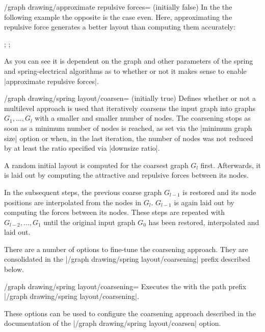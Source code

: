 \begin{key}{/graph drawing/approximate repulsive 
  forces= (initially false)}
  In the the following example the opposite is the case even. Here,
  approximating the repulsive force generates a better layout than
  computing them accurately:
  \begin{codeexample}[width=6cm]
\tikz {};
\tikz {};
  \end{codeexample}
  
  As you can see it is dependent on the graph and other parameters of
  the spring and spring-electrical algorithms as to whether or not it
  makes sense to enable |approximate repulsive forces|.
\end{key}

\begin{key}{/graph drawing/spring layout/coarsen=
  (initially true)}
  Defines whether or not a multilevel approach is used that
  iteratively coarsens the input graph into graphs $G_1,\dots,G_l$ with 
  a smaller and smaller number of nodes. The coarsening stops as soon as
  a minimum number of nodes is reached, as set via the 
  |minimum graph size| option or when, in the last iteration, the 
  number of nodes was not reduced by at least the ratio specified via 
  |downsize ratio|. 

  A random initial layout is computed for the coarsest graph $G_l$ first.
  Afterwards, it is laid out by computing the attractive and repulsive
  forces between its nodes. 
  
  In the subsequent steps, the previous coarse graph $G_{l-1}$ is 
  restored and its node positions are interpolated from the nodes in 
  $G_l$. $G_{l-1}$ is again laid out by computing the forces between 
  its nodes. These steps are repeated with $G_{l-2},\dots,G_1$ until 
  the original input graph $G_0$ has been restored, interpolated 
  and laid out.

  There are a number of options to fine-tune the coarsening approach.
  They are consolidated in the |/graph drawing/spring layout/coarsening|
  prefix described below.
\end{key}

\begin{key}{/graph drawing/spring layout/coarsening=}
  Executes the  with the path prefix 
  |/graph drawing/spring layout/coarsening|.

  These options can be used to configure the coarsening approach
  described in the documentation of the 
  |/graph drawing/spring layout/coarsen| option.
\end{key}

